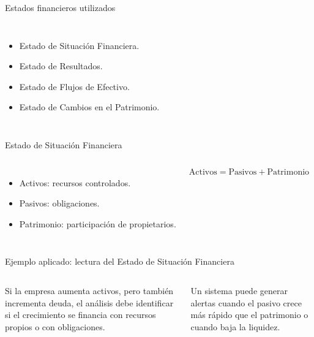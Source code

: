 \begin{frame}{Estados financieros utilizados}
  \begin{columns}[T,onlytextwidth]
    \begin{itemize}
      \item Estado de Situación Financiera.
      \item Estado de Resultados.
      \item Estado de Flujos de Efectivo.
      \item Estado de Cambios en el Patrimonio.
    \end{itemize}
  \end{columns}
\end{frame}

\begin{frame}{Estado de Situación Financiera}
  \begin{columns}[T,onlytextwidth]
    \begin{itemize}
      \item Activos: recursos controlados.
      \item Pasivos: obligaciones.
      \item Patrimonio: participación de propietarios.
    \end{itemize}
    \[
      \text{Activos}=\text{Pasivos}+\text{Patrimonio}
    \]
  \end{columns}
\end{frame}

\begin{frame}{Ejemplo aplicado: lectura del Estado de Situación Financiera}
  \begin{columns}[T,onlytextwidth]
    \footnotesize
    Si la empresa aumenta activos, pero también incrementa deuda, el análisis debe identificar si el crecimiento se financia con recursos propios o con obligaciones.

    \vspace{0.5em}
    Un sistema puede generar alertas cuando el pasivo crece más rápido que el patrimonio o cuando baja la liquidez.
  \end{columns}
\end{frame}

